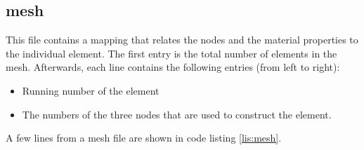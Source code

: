     	\subsection{mesh}
    	\label{subsec:mesh}
    		
    		This file contains a mapping that relates the nodes and the material properties to the individual element. The first entry is the total number of elements in the mesh. Afterwards, each line contains the following entries (from left to right):
    		\begin{itemize}
    			\item Running number of the element
    			\item The numbers of the three nodes that are used to construct the element.
	   		\end{itemize}
	   		A few lines from a mesh file are shown in code listing \ref{lis:mesh}.
    		